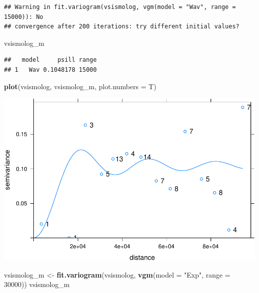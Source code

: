 \documentclass[11pt,]{article}
\newenvironment{Shaded}{\begin{snugshade}}{\end{snugshade}}
\newcommand{\KeywordTok}[1]{\textcolor[rgb]{0.13,0.29,0.53}{\textbf{#1}}}
\newcommand{\DataTypeTok}[1]{\textcolor[rgb]{0.13,0.29,0.53}{#1}}
\newcommand{\DecValTok}[1]{\textcolor[rgb]{0.00,0.00,0.81}{#1}}
\newcommand{\StringTok}[1]{\textcolor[rgb]{0.31,0.60,0.02}{#1}}
\newcommand{\NormalTok}[1]{#1}
\begin{document}
\begin{verbatim}
## Warning in fit.variogram(vsismolog, vgm(model = "Wav", range = 15000)): No
## convergence after 200 iterations: try different initial values?
\end{verbatim}

\begin{Shaded}
\begin{Highlighting}[]
\NormalTok{vsismolog_m}
\end{Highlighting}
\end{Shaded}

\begin{verbatim}
##   model     psill range
## 1   Wav 0.1048178 15000
\end{verbatim}

\begin{Shaded}
\begin{Highlighting}[]
\KeywordTok{plot}\NormalTok{(vsismolog, vsismolog_m, }\DataTypeTok{plot.numbers =}\NormalTok{ T)}
\end{Highlighting}
\end{Shaded}

\includegraphics{proyecto_files/figure-latex/unnamed-chunk-26-2.pdf}

\begin{Shaded}
\begin{Highlighting}[]
\NormalTok{vsismolog_m <-}\StringTok{ }\KeywordTok{fit.variogram}\NormalTok{(vsismolog, }\KeywordTok{vgm}\NormalTok{(}\DataTypeTok{model =} \StringTok{"Exp"}\NormalTok{, }\DataTypeTok{range =} \DecValTok{30000}\NormalTok{))}
\NormalTok{vsismolog_m}
\end{Highlighting}
\end{Shaded}
\end{document}
